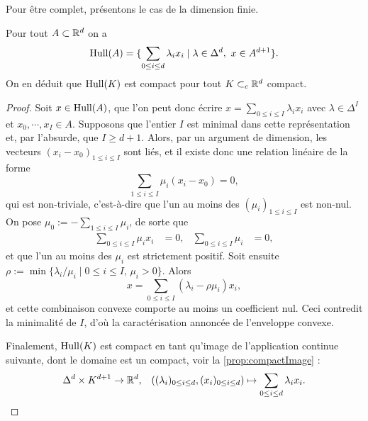 
Pour être complet, présentons le cas de la dimension finie.
\begin{theorem}[Carathéodory]
\label{th:Caratheodory}
%
Pour tout $A \subset \mathbb{R}^d$ on a 
\begin{equation*}
	\operatorname{Hull}(A) = \{\sum_{0 \leq i \leq d} \lambda_i x_i\mid \lambda \in \Delta^d,\ x \in A^{d+1}\}.
\end{equation*}
On en déduit que $\operatorname{Hull}(K)$ est compact pour tout $K \subset_c \mathbb{R}^d$ compact. 
\end{theorem}

\begin{proof}
	Soit $x \in \operatorname{Hull}(A)$, que l'on peut donc écrire $x = \sum_{0 \leq i \leq I} \lambda_i x_i$ avec $\lambda \in \Delta^I$ et $x_0,\cdots,x_I \in A$. Supposons que l'entier $I$ est minimal dans cette représentation et, par l'absurde, que $I\geq d+1$. Alors, par un argument de dimension, les vecteurs $(x_i-x_0)_{1 \leq i \leq I}$ sont liés, et il existe donc une relation linéaire de la forme
	\begin{equation*}
		\sum_{1 \leq i \leq I} \mu_i (x_i-x_0) = 0,
	\end{equation*}
	qui est non-triviale, c'est-à-dire que l'un au moins des $(\mu_i)_{1 \leq i \leq I}$ est non-nul.  
	On pose $\mu_0 := -\sum_{1 \leq i \leq I} \mu_i$, de sorte que 
	\begin{align*}
		\sum_{0 \leq i \leq I} \mu_i x_i &= 0, &
		\sum_{0 \leq i \leq I} \mu_i &= 0,
	\end{align*}
	et que l'un au moins des $\mu_i$ est strictement positif. Soit ensuite $\rho := \min\{\lambda_i / \mu_i \mid 0 \leq i \leq I,\, \mu_i > 0\}$. 
	Alors 
	\begin{equation*}
		x = \sum_{0 \leq i \leq I} (\lambda_i - \rho \mu_i) x_i,
	\end{equation*}
	et cette combinaison convexe comporte au moins un coefficient nul. Ceci contredit la minimalité de $I$, d'où la caractérisation annoncée de l'enveloppe convexe. 

	Finalement, $\operatorname{Hull}(K)$ est compact en tant qu'image de l'application continue suivante, dont le domaine est un compact, voir la \cref{prop:compactImage} : \belowdisplayskip=-12pt
	\begin{align*}
		\Delta^d \times K^{d+1} &\to \mathbb{R}^d, &
		( (\lambda_i)_{0 \leq i \leq d} ,(x_i)_{0\leq i \leq d}) \mapsto \sum_{0 \leq i \leq d} \lambda_i x_i.
	\end{align*}
\end{proof}


